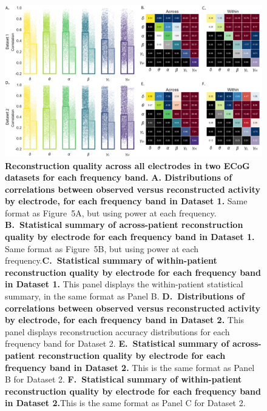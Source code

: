 \documentclass[10pt]{article}
\begin{document}
\begin{figure}[p]
\centering
\includegraphics[width=\textwidth]{figs/supplemental_4}
\caption{\textbf{Reconstruction quality across all electrodes in two
      ECoG datasets for each frequency band.} \textbf{A. Distributions of correlations
      between observed versus reconstructed activity by electrode, for
      each frequency band in Dataset 1.} Same format as Figure~5A, but
    using power at each frequency.
    \textbf{B.~Statistical summary of across-patient reconstruction
      quality by electrode for each frequency band in Dataset 1.} Same format as Figure~5B, but
    using power at each frequency.\textbf{C.~Statistical summary of within-patient reconstruction
      quality by electrode for each frequency band in Dataset 1.}
    This panel displays the within-patient statistical summary,
    in the same format as Panel B.  \textbf{D.~Distributions of correlations
      between observed versus reconstructed activity by electrode, for
      each frequency band in Dataset 2.}  This panel displays
    reconstruction accuracy distributions for each frequency band for
    Dataset 2. \textbf{E.~Statistical summary of
      across-patient reconstruction quality by electrode for each
      frequency band in Dataset 2.} This is the same format as Panel
    B for Dataset 2. \textbf{F.~Statistical summary of
      within-patient reconstruction quality by electrode for each
      frequency band in Dataset 2.}This is the same format as Panel
    C for Dataset 2.}
\label{fig:supplemental_4}
\end{figure}
\end{document}
